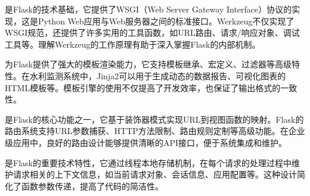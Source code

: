 是Flask的技术基础，它提供了WSGI（Web Server Gateway Interface）协议的实现，这是Python Web应用与Web服务器之间的标准接口。Werkzeug不仅实现了WSGI规范，还提供了许多实用的工具函数，如URL路由、请求/响应对象、调试工具等。理解Werkzeug的工作原理有助于深入掌握Flask的内部机制。

为Flask提供了强大的模板渲染能力，它支持模板继承、宏定义、过滤器等高级特性。在水利监测系统中，Jinja2可以用于生成动态的数据报告、可视化图表的HTML模板等。模板引擎的使用不仅提高了开发效率，也保证了输出格式的一致性。

是Flask的核心功能之一，它基于装饰器模式实现URL到视图函数的映射。Flask的路由系统支持URL参数捕获、HTTP方法限制、路由规则定制等高级功能。在企业级应用中，良好的路由设计能够提供清晰的API接口，便于系统集成和维护。

是Flask的重要技术特性，它通过线程本地存储机制，在每个请求的处理过程中维护请求相关的上下文信息，如当前请求对象、会话信息、应用配置等。这种设计简化了函数参数传递，提高了代码的简洁性。


